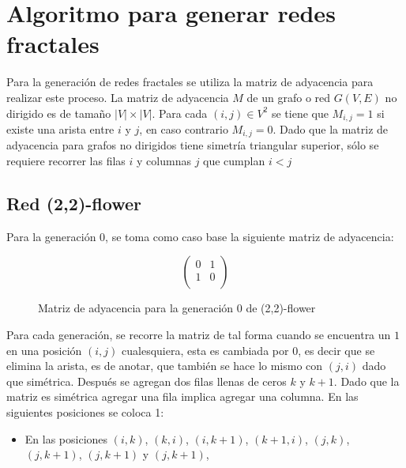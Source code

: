 \section{Algoritmo para generar redes fractales}

Para la generación de redes fractales se utiliza la matriz de adyacencia para realizar este proceso. La matriz de adyacencia $M$ de un grafo o red $G(V,E)$ no dirigido es de tamaño $|V|\times|V|$. Para cada $(i,j)\in V^2$ se tiene que $M_{i,j}=1$ si existe una arista entre $i$ y $j$, en caso contrario $M_{i,j}=0$. 
Dado que la matriz de adyacencia para grafos no dirigidos tiene simetría triangular superior, sólo se requiere recorrer las filas $i$ y columnas $j$ que cumplan $i<j$

\subsection{Red (2,2)-flower}

Para la generación 0, se toma como caso base la siguiente matriz de adyacencia:

\begin{figure}[H]
    \centering
\[ 
\left( \begin{array}{cc}
 0 & 1  \\ 
 1 & 0 \\
\end{array} \right)\]
\caption{Matriz de adyacencia para la generación 0 de (2,2)-flower}
\end{figure}

Para cada generación, se recorre la matriz de tal forma cuando se encuentra un $1$ en una posición $(i,j)$ cualesquiera, esta es cambiada por 0, es decir que se elimina la arista, es de anotar, que también se hace lo mismo con $(j,i)$ dado que simétrica.  Después se agregan dos filas llenas de ceros $k$ y $k+1$. Dado que la matriz es simétrica agregar una fila implica agregar una columna. En las siguientes posiciones se coloca 1:

\begin{itemize}
    \item En las posiciones $(i,k)$, $(k,i)$, $(i,k+1)$, $(k+1,i)$, $(j,k)$, $(j,k+1)$, $(j,k+1)$ y $(j,k+1)$,
\end{itemize}

